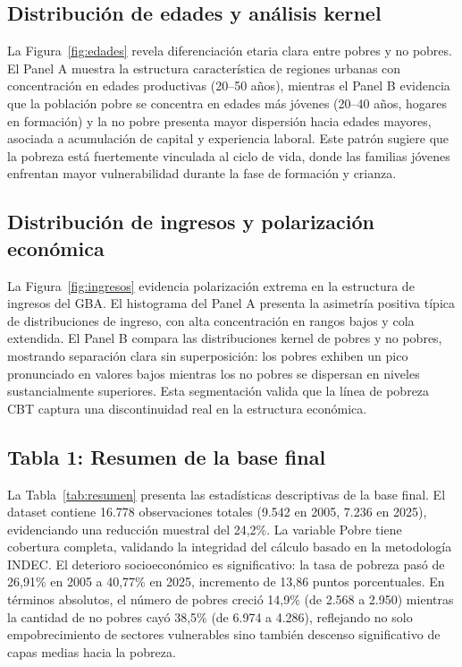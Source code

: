 \documentclass[11pt,a4paper]{article}
\begin{document}
\subsection{Distribución de edades y análisis kernel}

La Figura~\ref{fig:edades} revela diferenciación etaria clara entre pobres y no pobres. El Panel A muestra la estructura característica de regiones urbanas con concentración en edades productivas (20--50 años), mientras el Panel B evidencia que la población pobre se concentra en edades más jóvenes (20--40 años, hogares en formación) y la no pobre presenta mayor dispersión hacia edades mayores, asociada a acumulación de capital y experiencia laboral. Este patrón sugiere que la pobreza está fuertemente vinculada al ciclo de vida, donde las familias jóvenes enfrentan mayor vulnerabilidad durante la fase de formación y crianza.

\subsection{Distribución de ingresos y polarización económica}

La Figura~\ref{fig:ingresos} evidencia polarización extrema en la estructura de ingresos del GBA\@. El histograma del Panel A presenta la asimetría positiva típica de distribuciones de ingreso, con alta concentración en rangos bajos y cola extendida. El Panel B compara las distribuciones kernel de pobres y no pobres, mostrando separación clara sin superposición: los pobres exhiben un pico pronunciado en valores bajos mientras los no pobres se dispersan en niveles sustancialmente superiores. Esta segmentación valida que la línea de pobreza CBT captura una discontinuidad real en la estructura económica.

\subsection{Tabla 1: Resumen de la base final}

La Tabla~\ref{tab:resumen} presenta las estadísticas descriptivas de la base final. El dataset contiene 16.778 observaciones totales (9.542 en 2005, 7.236 en 2025), evidenciando una reducción muestral del 24,2\%. La variable Pobre tiene cobertura completa, validando la integridad del cálculo basado en la metodología INDEC\@. El deterioro socioeconómico es significativo: la tasa de pobreza pasó de 26,91\% en 2005 a 40,77\% en 2025, incremento de 13,86 puntos porcentuales. En términos absolutos, el número de pobres creció 14,9\% (de 2.568 a 2.950) mientras la cantidad de no pobres cayó 38,5\% (de 6.974 a 4.286), reflejando no solo empobrecimiento de sectores vulnerables sino también descenso significativo de capas medias hacia la pobreza.
\end{document}
